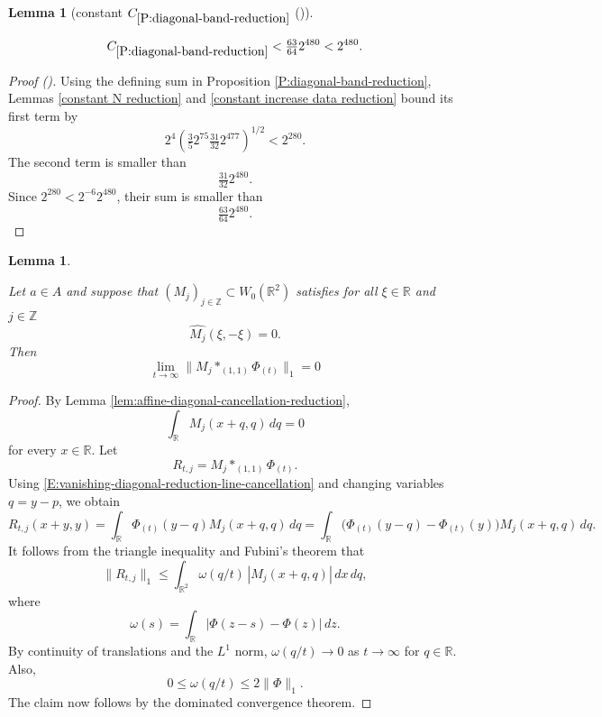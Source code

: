 \documentclass[12pt,reqno]{amsart}
\newcommand{\auto}{{({\tiny\faCar})}}
\theoremstyle{plain}
\newtheorem{lemma}[theorem]{Lemma}
\numberwithin{equation}{section}
\theoremstyle{remark}
\newcommand{\uses}[1]{}
\newcommand{\usesdefs}[1]{}
\newcommand{\leanok}{}
\newcommand{\lean}[1]{}
\newcommand{\Z}{{\mathbb Z}}
\newcommand{\R}{{\mathbb R}}
\begin{document}
\begin{lemma}[constant $C_{\ref{P:diagonal-band-reduction}}$ \auto]\label{constant diagonal band reduction}\uses{constant N reduction,constant increase data reduction,P:diagonal-band-reduction}\usesdefs{}
\lean{Auto.constantDiagonalBandReduction}
\leanok
\begin{equation}\label{constant diagonal band reduction bound}
C_{\ref{P:diagonal-band-reduction}}
<\tfrac{63}{64}2^{480}<2^{480}.
\end{equation}
\end{lemma}
\begin{proof}[Proof \auto]
Using the defining sum in Proposition \ref{P:diagonal-band-reduction}, Lemmas \ref{constant N reduction} and \ref{constant increase data reduction} bound its first term by
\[
2^4\left(\tfrac35 2^{75}\tfrac{31}{32}2^{477}\right)^{1/2}
<2^{280}.
\]
The second term is smaller than
\[
\tfrac{31}{32}2^{480}.
\]
Since $2^{280}<2^{-6}2^{480}$, their sum is smaller than
\[
\tfrac{63}{64}2^{480}.
\]
\end{proof}


\begin{lemma}\label{lem:L1-reduction}\uses{lem:affine-diagonal-cancellation-reduction}\usesdefs{auto:Wiener-space-definition,auto:convolution-along-vector-definition,multiplicatively spaced monotone sequences,standard bump}
\lean{Auto.lOneReduction}
\leanok

Let $a\in A$ and suppose that $(M_j)_{j\in\Z}\subset W_0(\R^2)$ satisfies for all $\xi \in \R$ and $j\in \Z$
\begin{equation}\label{auto:vanishing-diagonal-assumption}
\widehat{M_j}(\xi,-\xi)=0.
\end{equation}
Then
\begin{equation}\label{auto:vanishing-diagonal-large-scale-limit}    \lim_{t\to\infty}
    \| M_j\ast_{(1,1)}\Phi_{(t)} \|_1
    =0
    \end{equation}
\end{lemma}

\begin{proof}


By Lemma \ref{lem:affine-diagonal-cancellation-reduction},
\begin{equation}
    \label{E:vanishing-diagonal-reduction-line-cancellation}
    \int_{\mathbb R}M_j(x+q,q)\,dq=0
\end{equation}
for every \(x\in\mathbb R\).
Let
\[
R_{t,j}=M_j\ast_{(1,1)}\Phi_{(t)}.
\]
Using \eqref{E:vanishing-diagonal-reduction-line-cancellation} and
changing variables \(q=y-p\), we obtain
\[
R_{t,j}(x+y,y) = \int_{\mathbb R} \Phi_{(t)}(y-q)M_j(x+q,q)\,dq = \int_{\mathbb R} \bigl(\Phi_{(t)}(y-q)-\Phi_{(t)}(y)\bigr) M_j(x+q,q)\,dq.
\]
It follows from the triangle inequality and Fubini's theorem that
    \[
    \|R_{t,j}\|_1
    \le
    \int_{\mathbb R^2}
    \omega(q/t)\,
    |M_j(x+q,q)|\,dx\,dq,
    \]
    where
    \[
    \omega(s)
    =
    \int_{\mathbb R}|\Phi(z-s)-\Phi(z)|\,dz.
    \]
    By continuity of translations and the $L^1$ norm,
    \(\omega(q/t)\to0\) as \(t\to\infty\) for   \(q\in\mathbb R\).
    Also,
    \[
    0\le \omega(q/t)\le 2\|\Phi\|_1.
    \]
The claim now follows by the
    dominated convergence theorem.
\end{proof}
\end{document}
